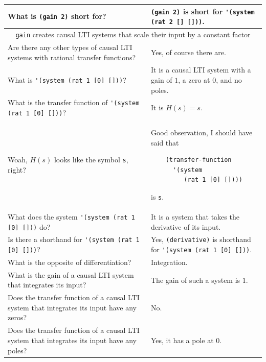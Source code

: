\documentclass[11pt,letter]{article}
\begin{document}
\begin{longtable}{ p{} p{} }
  What is \lstinline!(gain 2)! short for?
  &
  \lstinline!(gain 2)! is short for \lstinline!'(system (rat 2 [] []))!.\\

  \midrule

  \multicolumn{2}{c}{\Large\lstinline!gain! creates causal LTI systems that scale their input by a constant factor} \\

  \midrule

  Are there any other types of causal LTI systems with rational transfer functions?
  &
  Yes, of course there are. \\

  What is \lstinline!'(system (rat 1 [0] []))!?
  &
  It is a causal LTI system with a gain of $1$, a zero at $0$, and no poles. \\

  What is the transfer function of \lstinline!'(system (rat 1 [0] []))!?
  &
  It is $H(s)=s$. \\

  Woah, $H(s)$ looks like the symbol \lstinline!s!, right?
  &
  Good observation, I should have said that
  \begin{lstlisting}
    (transfer-function
      '(system
         (rat 1 [0] [])))
  \end{lstlisting}
  is \lstinline!s!. \\

  What does the system \lstinline!'(system (rat 1 [0] []))! do?
  &
  It is a system that takes the derivative of its input. \\

  Is there a shorthand for \lstinline!'(system (rat 1 [0] []))!?
  &
  Yes, \lstinline!(derivative)! is shorthand for \lstinline!'(system (rat 1 [0] []))!. \\

  What is the opposite of differentiation?
  &
  Integration. \\

  What is the gain of a causal LTI system that integrates its input?
  &
  The gain of such a system is $1$. \\

  Does the transfer function of a causal LTI system that integrates its input have any zeros?
  &
  No. \\

  Does the transfer function of a causal LTI system that integrates its input have any poles?
  &
  Yes, it has a pole at $0$. \\


\end{longtable}
\end{document}
